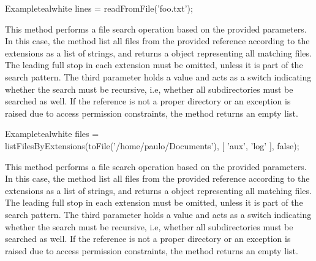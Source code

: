 \begin{description}
\begin{codebox}{Example}{teal}{\icnote}{white}
lines = readFromFile('foo.txt');
\end{codebox}

\item[\mdbox{R}{\parbox{0.61\textwidth}{listFilesByExtensions(File file,\\\hspace*{1em} List<String> extensions, boolean recursive)}}{List<File>}] This method performs a file search operation based on the provided parameters. In this case, the method list all files from the provided  reference according to the  extensions as a list of strings, and returns a  object representing all matching files. The leading full stop in each extension must be omitted, unless it is part of the search pattern. The third parameter holds a  value and acts as a switch indicating whether the search must be recursive, i.e, whether all subdirectories must be searched as well. If the reference is not a proper directory or an exception is raised due to access permission constraints, the  method returns an empty list.

\begin{codebox}{Example}{teal}{\icnote}{white}
files = listFilesByExtensions(toFile('/home/paulo/Documents'),
        [ 'aux', 'log' ], false);
\end{codebox}

\item[\mdbox{R}{\parbox{0.61\textwidth}{listFilesByExtensions(String reference,\\\hspace*{1em} List<String> extensions, boolean recursive)}}{List<File>}] This method performs a file search operation based on the provided parameters. In this case, the method list all files from the provided  reference according to the  extensions as a list of strings, and returns a  object representing all matching files. The leading full stop in each extension must be omitted, unless it is part of the search pattern. The third parameter holds a  value and acts as a switch indicating whether the search must be recursive, i.e, whether all subdirectories must be searched as well. If the reference is not a proper directory or an exception is raised due to access permission constraints, the  method returns an empty list.


\end{description}
